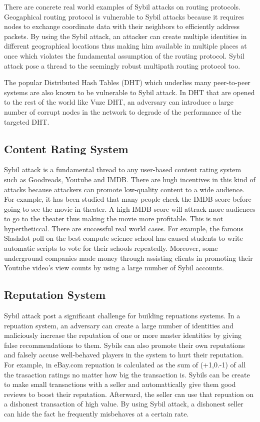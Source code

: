 \documentclass[conference]{IEEEtran}
\begin{document}
There are concrete real world examples of Sybil attacks on routing protocols.
Geogaphical routing protocol is vulnerable to Sybil attacks because it requires nodes to exchange coordinate data with their neighbors to efficiently address packets. By using the Sybil attack, an attacker can create multiple identities in different geographical locations thus making him available in multiple places at once which violates the fundamental assumption of the routing protocol\cite{Karlof03securerouting}. Sybil attack pose a thread to the seemingly robust multipath routing protocol too.\cite{Karlof03securerouting}

The popular Distributed Hash Tables (DHT) which underlies many peer-to-peer systems are also known to be vulnerable to Sybil attack. In DHT that are opened to the rest of the world like Vuze DHT, an adversary can introduce a large number of corrupt nodes in the network to degrade of the performance of the targeted DHT.\cite{Danezis05sybil-resistantdht} 

\subsection{Content Rating System}
Sybil attack is a fundamental thread to any user-based content rating system such as Goodreads, Youtube and IMDB. There are hugh incentives in this kind of attacks because attackers can promote low-quality content to a wide audience. For example, it has been studied that many people check the IMDB score before going to see the movie in theater. A high IMDB score will attrack more audiences to go to the theater thus making the movie more profitable. This is not hypertheticcal. There are successful real world cases. For example, the famous Slashdot poll on the best compute science school has caused students to write automatic scripts to vote for their schools repeatedly. Moreover, some underground companies made money through assisting clients in promoting their Youtube video's view counts by using a large number of Sybil accounts.\cite{Tran09SOC}

\subsection{Reputation System}
Sybil attack post a significant challenge for building repuations systems. In a repuation system, an adversary can create a large number of identities and maliciously increase the reputation of one or more master identities by giving false recommendations to them. Sybils can also promote their own reputations and falsely accuse well-behaved players in the system to hurt their reputation. For example, in eBay.com repuation is calculated as the sum of (+1,0.-1) of all the trasaction ratings no matter how big the transaction is. Sybils can be create to make small transactions with a seller and automattically give them good reviews to boost their reputation. Afterward, the seller can use that repuation on a dishonest transaction of high value. By using Sybil attack, a dishonest seller can hide the fact he frequently misbehaves at a certain rate.
\end{document}
